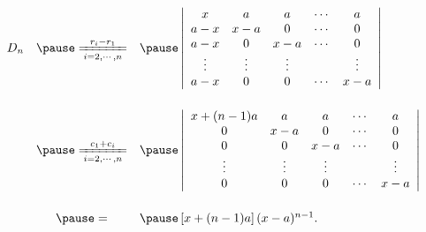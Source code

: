 \begin{frame}
  \begin{center}
  \end{center}

  $$
  \begin{array}{rcl}
    D_n 
    & \pause \xlongequal[i=2,\cd, n]{r_i - r_1} &  \pause
    \left|
    \begin{array}{ccccc}
      x   & a   & a    & \cd & a \\
      a-x & x-a & 0    & \cd & 0 \\
      a-x & 0   & x-a  & \cd & 0 \\
      \vd & \vd  & \vd &  & \vd \\
      a-x & 0   & 0    & \cd & x-a 
    \end{array}
    \right| \\[0.6in]
    & \pause \xlongequal[i=2,\cd,n]{c_1+c_i} & \pause
    \left|
    \begin{array}{ccccc}
      x+(n-1)a & a   & a    & \cd & a \\
      0    & x-a & 0    & \cd & 0 \\
      0    & 0   & x-a  & \cd & 0 \\
      \vd & \vd  & \vd &  & \vd \\
      0    & 0   & 0    & \cd & x-a 
    \end{array}
    \right|   \\[0.6in]
    & \pause = & \pause  \left[x+(n-1)a\right](x-a)^{n-1}.
  \end{array}
  $$
\end{frame}


